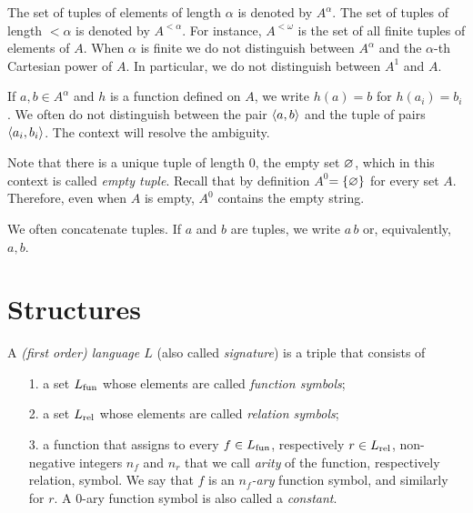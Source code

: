 The set of tuples of elements of length $\alpha$ is denoted by \emph{$A^\alpha$}.
The set of tuples of length $<\alpha$ is denoted by \emph{$A^{<\alpha}$}.
For instance, \emph{$A^{<\omega}$\/} is the set of all finite tuples of elements of $A$.
When $\alpha$ is finite we do not distinguish between $A^\alpha$ and the $\alpha$-th Cartesian power of $A$.
In particular, we do not distinguish between $A^1$ and $A$.

If $a,b\in A^{\alpha}$ and $h$ is a function defined on $A$, we write $h(a)=b$ for $h(a_i)=b_i$.
We often do not distinguish between the pair $\langle a,b\rangle$ and the tuple of pairs $\langle a_i,b_i\rangle$.
The context will resolve the ambiguity.

Note that there is a unique tuple of length $0$, the empty set $\varnothing$, which in this context is called \emph{empty tuple\/}.
Recall that by definition \emph{$A^{0}$\/}$=\{\varnothing\}$ for every set $A$.
Therefore, even when $A$ is empty, $A^{0}$ contains the empty string.

We often concatenate tuples.
If $a$ and $b$ are tuples, we write \emph{$a\,b$\/} or, equivalently,\ \emph{$a,b$\/}. 

\section{Structures}

A \emph{(first order) language $L$\/}  (also called \emph{signature\/}) is a triple that consists of

\begin{itemize}
\item[1.] a set \emph{$L_{\rm fun}$} whose elements are called \emph{function symbols};
\item[2.] a set \emph{$L_{\rm rel}$\/} whose elements are called \emph{relation symbols};
\item[3.] a function that assigns to every $f\in L_{\rm fun}$, respectively $r\in L_{\rm rel}$, non-negative integers $n_f$ and $n_r$ that we call \emph{arity\/} of the function, respectively relation, symbol. We say that $f$ is an \emph{$n_f$-ary} function symbol, and similarly for $r$. A $0$-ary function symbol is also called a \emph{constant\/}.
\end{itemize}

